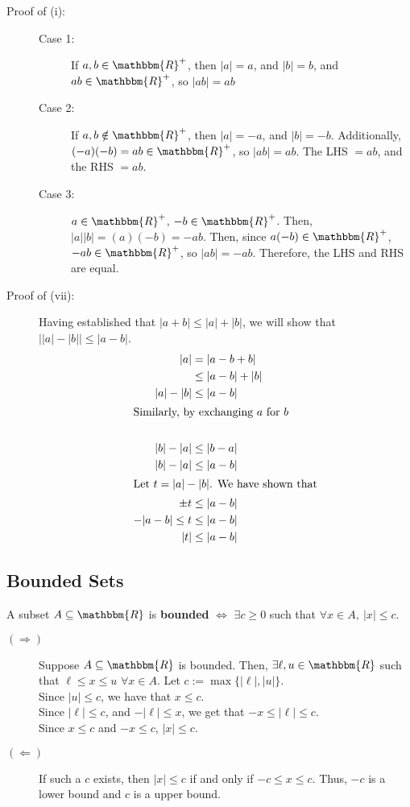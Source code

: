 \documentclass[10pt]{extarticle}
\newcommand{\R}{\mathbbm{R}}
\begin{document}
      \begin{description}
        \item[Proof of (i):]\hfill
          \begin{description}
            \item[Case 1:] If $a,b\in\R^+$, then $|a| = a$, and $|b| = b$, and $ab \in \R^+$, so $|ab| = ab$
            \item[Case 2:] If $a,b\notin\R^+$, then $|a| = -a$, and $|b| = -b$. Additionally, $(-a)(-b)=ab \in\R^+$, so $|ab| = ab$. The LHS $=ab$, and the RHS $=ab$.
            \item[Case 3:] $a\in\R^+$, $-b\in\R^+$. Then, $|a||b| = (a)(-b) = -ab$. Then, since $a(-b)\in\R^+$, $-ab\in\R^+$, so $|ab| = -ab$. Therefore, the LHS and RHS are equal.
          \end{description}
        \item[Proof of (vii):] Having established that $|a+b| \leq |a| + |b|$, we will show that $\vert|a| - |b|\vert \leq |a-b|$.
          \begin{align*}
            |a| &= |a-b+b| \\
                &\leq |a-b| + |b| \\
            |a| - |b| &\leq |a-b|\\
            \shortintertext{Similarly, by exchanging $a$ for $b$}\\
            |b| - |a| &\leq |b-a|\\
            |b| - |a| &\leq |a-b|\\
            \shortintertext{Let $t = |a| - |b|$. We have shown that}
            \pm t &\leq |a-b|\\
            -|a-b| \leq t &\leq |a-b|\\
            |t| &\leq |a-b|
          \end{align*}
      \end{description}
  \subsection{Bounded Sets}%
    A subset $A\subseteq \R$ is \textbf{bounded} $\Leftrightarrow$  $\exists c \geq 0$ such that $\forall x\in A,~|x| \leq c$.
    \begin{description}
      \item[$(\Rightarrow)$] Suppose $A\subseteq \R$ is bounded. Then, $\exists \ell,u\in \R$ such that $\ell\leq x\leq u$ $\forall x\in A$. Let $c := \max\{|\ell|,|u|\}$.\\

        Since $|u| \leq c$, we have that $x\leq c$.\\

        Since $|\ell| \leq c$, and $-|\ell| \leq x$, we get that $-x \leq |\ell| \leq c$.\\

        Since $x\leq c$ and $-x\leq c$, $|x| \leq c$.
      \item[$(\Leftarrow)$] If such a $c$ exists, then $|x| \leq c$ if and only if $-c \leq x \leq c$. Thus, $-c$ is a lower bound and $c$ is a upper bound.
    \end{description}
\end{document}
